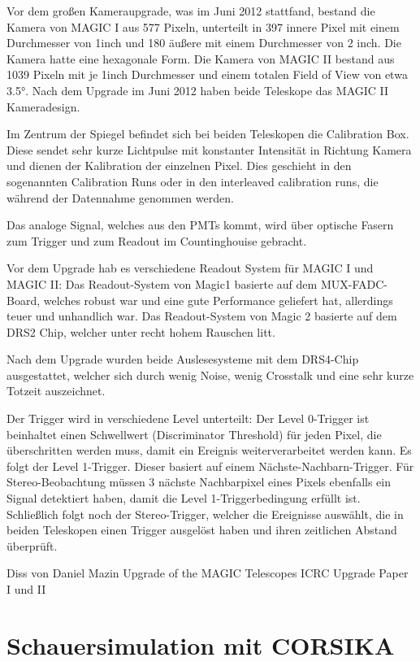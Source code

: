 Vor dem großen Kameraupgrade, was im Juni 2012 stattfand, bestand die Kamera von MAGIC I aus 577 Pixeln, unterteilt in 397 innere Pixel mit einem Durchmesser von 1inch und 180 äußere mit einem Durchmesser von 2 inch.
Die Kamera hatte eine hexagonale Form.
Die Kamera von MAGIC II bestand aus 1039 Pixeln mit je 1inch Durchmesser und einem totalen Field of View von etwa 3.5°.
Nach dem Upgrade im Juni 2012 haben beide Teleskope das MAGIC II Kameradesign.

Im Zentrum der Spiegel befindet sich bei beiden Teleskopen die Calibration Box.
Diese sendet sehr kurze Lichtpulse mit konstanter Intensität in Richtung Kamera und dienen der Kalibration der einzelnen Pixel.
Dies geschieht in den sogenannten Calibration Runs oder in den interleaved calibration runs, die während der Datennahme genommen werden.

Das analoge Signal, welches aus den PMTs kommt, wird über optische Fasern zum Trigger und zum Readout im Countinghouise gebracht.

Vor dem Upgrade hab es verschiedene Readout System für MAGIC I und MAGIC II:
Das Readout-System von Magic1 basierte auf dem MUX-FADC-Board, welches robust war und eine gute Performance geliefert hat, allerdings teuer und unhandlich war.
Das Readout-System von Magic 2 basierte auf dem DRS2 Chip, welcher unter recht hohem Rauschen litt.

Nach dem Upgrade wurden beide Auslesesysteme mit dem DRS4-Chip ausgestattet, welcher sich durch wenig Noise, wenig Crosstalk und eine sehr kurze Totzeit auszeichnet.

Der Trigger wird in verschiedene Level unterteilt:
Der Level 0-Trigger ist beinhaltet einen Schwellwert (Discriminator Threshold) für jeden Pixel, die überschritten werden muss, damit ein Ereignis weiterverarbeitet werden kann.
Es folgt der Level 1-Trigger. Dieser basiert auf einem Nächste-Nachbarn-Trigger. 
Für Stereo-Beobachtung müssen 3 nächste Nachbarpixel eines Pixels ebenfalls ein Signal detektiert haben, damit die Level 1-Triggerbedingung erfüllt ist.
Schließlich folgt noch der Stereo-Trigger, welcher die Ereignisse auswählt, die in beiden Teleskopen einen Trigger ausgelöst haben und ihren zeitlichen Abstand überprüft.

Diss von Daniel Mazin
Upgrade of the MAGIC Telescopes ICRC
Upgrade Paper I und II


\section{Schauersimulation mit CORSIKA}
\label{sec:Corsika}

